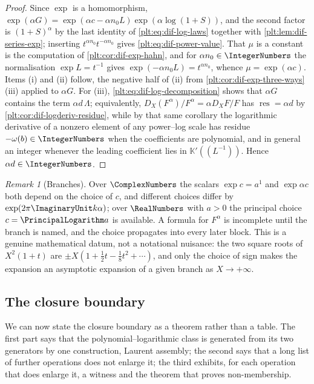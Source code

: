 \documentclass[11pt,oneside]{article}
\theoremstyle{plain}
\theoremstyle{definition}
\theoremstyle{remark}
\newtheorem{remark}[theorem]{Remark}
\newcommand{\K}{\mathbb{K}}
\newcommand{\DX}{D_{X}}                                  %
\begin{document}
\begin{proof}
Since \(\exp\) is a homomorphism, \(\exp(\alpha G)=\exp(\alpha c-\alpha
n_{0}L)\exp(\alpha\log(1+S))\), and the second factor is
\((1+S)^{\alpha}\) by the last identity of \cref{plt:eq:dif-log-laws} together
with \cref{plt:lem:dif-series-exp}; inserting \(t^{\alpha n_{0}}
t^{-\alpha n_{0}}\) gives \cref{plt:eq:dif-power-value}.  That \(\mu\) is a
constant is the computation of \cref{plt:cor:dif-exp-hahn}, and for
\(\alpha n_{0}\in\IntegerNumbers\) the normalisation \(\exp L=t^{-1}\) gives
\(\exp(-\alpha n_{0}L)=t^{\alpha n_{0}}\), whence \(\mu=\exp(\alpha c)\).
Items (i) and (ii) follow, the negative half of (ii) from
\cref{plt:cor:dif-exp-three-ways}(iii) applied to \(\alpha G\).  For (iii),
\cref{plt:eq:dif-log-decomposition} shows that \(\alpha G\) contains the term
\(\alpha d\,\Lambda\); equivalently, \(\DX(F^{\alpha})/F^{\alpha}=\alpha\DX
F/F\) has \(\operatorname{res}=\alpha d\) by
\cref{plt:cor:dif-logderiv-residue}, while by that same corollary the
logarithmic derivative of a nonzero element of any power--log scale has
residue \(-\omega(b)\in\IntegerNumbers\) when the coefficients are polynomial,
and in general an integer whenever the leading coefficient lies in
\(\K'((L^{-1}))\).  Hence \(\alpha d\in\IntegerNumbers\).
\end{proof}

\begin{remark}[Branches]\label{plt:rmk:dif-branches}
Over \(\ComplexNumbers\) the scalars \(\exp c=a^{1}\) and \(\exp\alpha c\) both
depend on the choice of \(c\), and different choices differ by
\(\exp(2\pi\ImaginaryUnit k\alpha)\); over \(\RealNumbers\) with \(a>0\) the
principal choice \(c=\PrincipalLogarithm a\) is available.  A formula for
\(F^{\alpha}\) is incomplete until the branch is named, and the choice
propagates into every later block.  This is a genuine mathematical datum, not a
notational nuisance: the two square roots of \(X^{2}(1+t)\) are
\(\pm X(1+\tfrac12t-\tfrac18t^{2}+\cdots)\), and only the choice of sign makes
the expansion an asymptotic expansion of a given branch as \(X\to+\infty\).
\end{remark}

\subsection{The closure boundary}
\label{plt:sec:dif-boundary}

We can now state the closure boundary as a theorem rather than a table.  The
first part says that the polynomial--logarithmic class is generated from its
two generators by one construction, Laurent assembly; the second says that a
long list of further operations does not enlarge it; the third exhibits, for
each operation that does enlarge it, a witness and the theorem that proves
non-membership.
\end{document}
